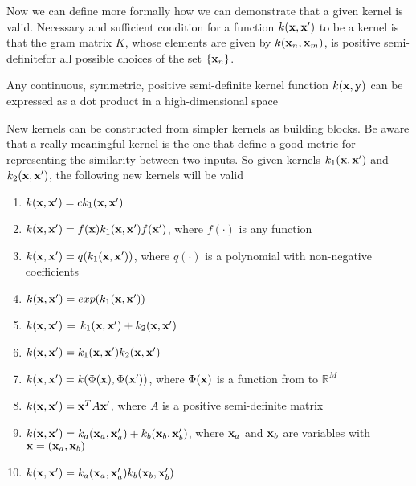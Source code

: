 \documentclass[main.tex]{subfiles}
\begin{document}
Now we can define more formally how we can demonstrate that a given kernel is valid.
Necessary and sufficient condition for a function $k(\textbf{x}, \textbf{x}')$ to be a kernel is that the gram matrix $K$, whose elements are given by $k(\textbf{x}_n, \textbf{x}_m)$, is positive semi-definite\footnotemark for all possible choices of the set $\{\textbf{x}_n\}$.
\begin{theorem}
Any continuous, symmetric, positive semi-definite kernel function $k(\textbf{x}, \textbf{y})$ can be expressed as a dot product in a high-dimensional space
\end{theorem}
New kernels can be constructed from simpler kernels as building blocks.
Be aware that a really meaningful kernel is the one that define a good metric for representing the similarity between two inputs. 
So given kernels $k_1(\textbf{x},\textbf{x}')$ and $k_2(\textbf{x},\textbf{x}')$, the following new kernels will be
valid
\begin{enumerate}
    \item $k(\textbf{x},\textbf{x}') = ck_1(\textbf{x},\textbf{x}')$
    \item $k(\textbf{x},\textbf{x}') = f(\textbf{x})k_1(\textbf{x},\textbf{x}')f(\textbf{x}')$, where $f(\cdot)$ is any function
    \item $k(\textbf{x},\textbf{x}') = q(k_1(\textbf{x},\textbf{x}'))$, where $q(\cdot)$ is a polynomial with non-negative coefficients
    \item $k(\textbf{x},\textbf{x}') = exp(k_1(\textbf{x},\textbf{x}'))$
    \item $k(\textbf{x},\textbf{x}')$ = $k_1(\textbf{x},\textbf{x}')+k_2(\textbf{x},\textbf{x}')$
    \item $k(\textbf{x},\textbf{x}')=k_1(\textbf{x},\textbf{x}')k_2(\textbf{x},\textbf{x}')$
    \item $k(\textbf{x},\textbf{x}')=k(\Phi(\textbf{x}),\Phi(\textbf{x}'))$, where $\Phi(\textbf{x})$ is a function from  to $\mathbb{R}^M$
    \item $k(\textbf{x},\textbf{x}') = \textbf{x}^TA\textbf{x}'$, where $A$ is a positive semi-definite matrix
    \item $k(\textbf{x},\textbf{x}') = k_a(\textbf{x}_a,\textbf{x}_a') + k_b(\textbf{x}_b,\textbf{x}_b')$, where $\textbf{x}_a$ and $\textbf{x}_b$ are variables with $\textbf{x}=(\textbf{x}_a,\textbf{x}_b)$
    \item $k(\textbf{x},\textbf{x}')=k_a(\textbf{x}_a,\textbf{x}_a') k_b(\textbf{x}_b,\textbf{x}_b')$
\end{enumerate}
\end{document}
